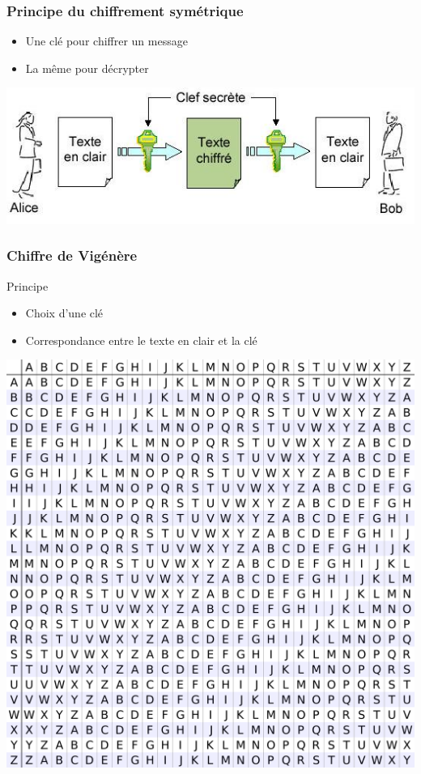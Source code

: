 \documentclass[xcolor={dvipsnames}]{beamer}
\begin{document}
\begin{frame}
\frametitle{Principe du chiffrement symétrique}

\begin{itemize}
	\item Une clé pour chiffrer un message
	\item La même pour décrypter
\end{itemize}

\begin{center}
	\includegraphics[scale=0.5]{sym}
\end{center}
\end{frame}

\begin{frame}
\frametitle{Chiffre de Vigénère}

\begin{block}{Principe}
	\begin{itemize}
		\item Choix d'une clé
		\item Correspondance entre le texte en clair et la clé
	\end{itemize}
	
	\begin{center}
		\includegraphics[scale=0.07]{vigenere}
	\end{center}
\end{block}
\end{frame}
\end{document}
